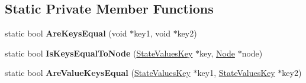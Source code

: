 \subsection*{Static Private Member Functions}
\begin{DoxyCompactItemize}
\item 
static bool {\bfseries Are\+Keys\+Equal} (void $\ast$key1, void $\ast$key2)\hypertarget{classv8_1_1internal_1_1compiler_1_1_state_values_cache_ac83b8932d4b9fc5e8728068a271e8c03}{}\label{classv8_1_1internal_1_1compiler_1_1_state_values_cache_ac83b8932d4b9fc5e8728068a271e8c03}

\item 
static bool {\bfseries Is\+Keys\+Equal\+To\+Node} (\hyperlink{structv8_1_1internal_1_1compiler_1_1_state_values_cache_1_1_state_values_key}{State\+Values\+Key} $\ast$key, \hyperlink{classv8_1_1internal_1_1compiler_1_1_node}{Node} $\ast$node)\hypertarget{classv8_1_1internal_1_1compiler_1_1_state_values_cache_a6c80ef903f186c6e2a44d7dfee1217f8}{}\label{classv8_1_1internal_1_1compiler_1_1_state_values_cache_a6c80ef903f186c6e2a44d7dfee1217f8}

\item 
static bool {\bfseries Are\+Value\+Keys\+Equal} (\hyperlink{structv8_1_1internal_1_1compiler_1_1_state_values_cache_1_1_state_values_key}{State\+Values\+Key} $\ast$key1, \hyperlink{structv8_1_1internal_1_1compiler_1_1_state_values_cache_1_1_state_values_key}{State\+Values\+Key} $\ast$key2)\hypertarget{classv8_1_1internal_1_1compiler_1_1_state_values_cache_a8d117710716366387efb15e85eb88ef9}{}\label{classv8_1_1internal_1_1compiler_1_1_state_values_cache_a8d117710716366387efb15e85eb88ef9}

\end{DoxyCompactItemize}
